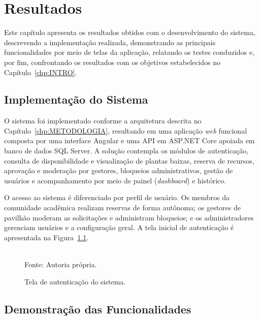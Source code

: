 \chapter{Resultados}\label{chp:RESULTADOS}

Este capítulo apresenta os resultados obtidos com o desenvolvimento do sistema, descrevendo a implementação realizada, demonstrando as principais funcionalidades por meio de telas da aplicação, relatando os testes conduzidos e, por fim, confrontando os resultados com os objetivos estabelecidos no Capítulo~\ref{chp:INTRO}.

\section{Implementação do Sistema}\label{sec:implementacao}

O sistema foi implementado conforme a arquitetura descrita no Capítulo~\ref{chp:METODOLOGIA}, resultando em uma aplicação \textit{web} funcional composta por uma interface Angular e uma API em ASP.NET Core apoiada em banco de dados SQL Server. A solução contempla os módulos de autenticação, consulta de disponibilidade e visualização de plantas baixas, reserva de recursos, aprovação e moderação por gestores, bloqueios administrativos, gestão de usuários e acompanhamento por meio de painel (\textit{dashboard}) e histórico.

O acesso ao sistema é diferenciado por perfil de usuário. Os membros da comunidade acadêmica realizam reservas de forma autônoma; os gestores de pavilhão moderam as solicitações e administram bloqueios; e os administradores gerenciam usuários e a configuração geral. A tela inicial de autenticação é apresentada na Figura~\ref{fig:tela-login}.

\begin{figure}[H]
  \centering
  \framebox[0.7\textwidth]{\rule{0pt}{7cm}}%
  \caption{Tela de autenticação do sistema.}
  \label{fig:tela-login}\\
  {\footnotesize Fonte: Autoria própria.}
\end{figure}

\section{Demonstração das Funcionalidades}\label{sec:demonstracao}

